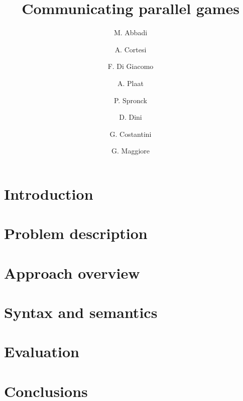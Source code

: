 \documentclass[12pt,a4paper]{article}
\begin{document}
\title{Communicating parallel games}
\author{M. Abbadi \and A. Cortesi \and F. Di Giacomo \and A. Plaat \and P. Spronck \and D. Dini \and G. Costantini \and G. Maggiore}
\maketitle

\section{Introduction}
\label{sec:introduction}


\section{Problem description}
\label{sec:problem}


\section{Approach overview}
\label{sec:idea}


\section{Syntax and semantics}
\label{sec:definition}


\section{Evaluation}
\label{sec:evaluation}


\section{Conclusions}
\label{sec:conclusions}

\end{document}

